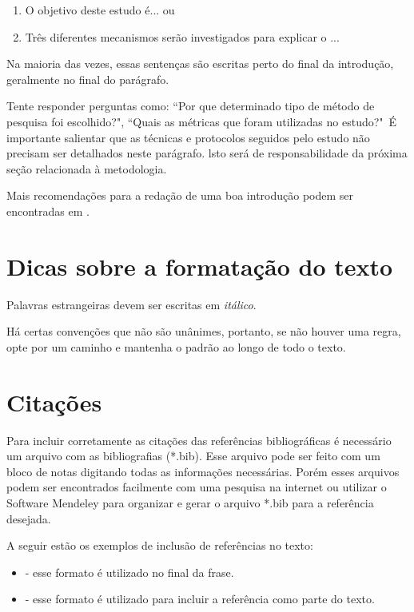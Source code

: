     \begin{enumerate}
        \item O objetivo deste estudo é... ou
        \item Três diferentes mecanismos serão investigados para explicar o ...
    \end{enumerate}
    
    Na maioria das vezes, essas sentenças são escritas perto do final da introdução, geralmente no final do parágrafo. %
    
    Tente responder perguntas como: ``Por que determinado tipo de método de pesquisa foi escolhido?", ``Quais as métricas que foram utilizadas no estudo?"\ É importante salientar que as técnicas e protocolos seguidos pelo estudo não precisam ser detalhados neste parágrafo. lsto será de responsabilidade da próxima seção relacionada à metodologia.
    
    Mais recomendações para a redação de uma boa introdução podem ser encontradas em .
    
    \section*{Dicas sobre a formatação do texto}
    
    Palavras estrangeiras devem ser escritas em \textit{itálico}.

    Há certas convenções que não são unânimes, portanto, se não houver uma regra, opte por um caminho e mantenha o padrão ao longo de todo o texto.
    
    \section*{Citações}
    Para incluir corretamente as citações das referências bibliográficas é necessário um arquivo com as bibliografias (*.bib). Esse arquivo pode ser feito com um bloco de notas digitando todas as informações necessárias. Porém esses arquivos podem ser encontrados facilmente com uma pesquisa na internet ou utilizar o Software Mendeley para organizar e gerar o arquivo *.bib para a referência desejada. 
    
    A seguir estão os exemplos de inclusão de referências no texto:
    \begin{itemize}
        \item \cite{yilmaz2001} - esse formato é utilizado no final da frase.
        \item {} -  esse formato é utilizado para incluir a referência como parte do texto.
    \end{itemize}
    
